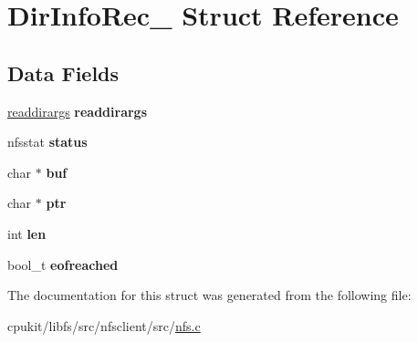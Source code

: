 \hypertarget{structDirInfoRec__}{}\section{Dir\+Info\+Rec\+\_\+ Struct Reference}
\label{structDirInfoRec__}
\subsection*{Data Fields}
\begin{DoxyCompactItemize}
\item 
\mbox{\label{structDirInfoRec___ac90d11bf1cf3ab03da010ebf3c074f57}} 
\mbox{\hyperlink{structreaddirargs}{readdirargs}} {\bfseries readdirargs}
\item 
\mbox{\label{structDirInfoRec___aebd35a184ff0105162e90ca5696a85e9}} 
nfsstat {\bfseries status}
\item 
\mbox{\label{structDirInfoRec___aa25fbcf1943d50b658e5214f9b7fcecb}} 
char $\ast$ {\bfseries buf}
\item 
\mbox{\label{structDirInfoRec___a15f83e0c79470c4491dab80fcdceb274}} 
char $\ast$ {\bfseries ptr}
\item 
\mbox{\label{structDirInfoRec___a83583fa04bce3ab78b9247dff1c46fc4}} 
int {\bfseries len}
\item 
\mbox{\label{structDirInfoRec___ae3e8fdadcc0ce3f0d2d537818311c586}} 
bool\+\_\+t {\bfseries eofreached}
\end{DoxyCompactItemize}


The documentation for this struct was generated from the following file\+:\begin{DoxyCompactItemize}
\item 
cpukit/libfs/src/nfsclient/src/\mbox{\hyperlink{nfs_8c}{nfs.\+c}}\end{DoxyCompactItemize}

